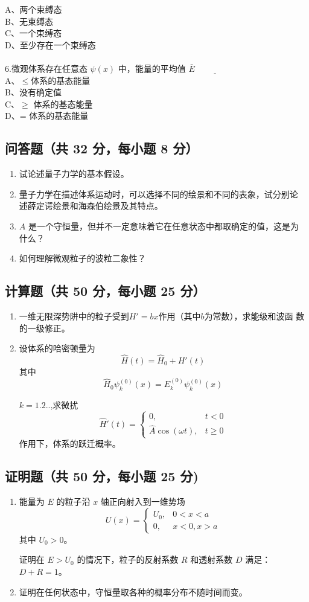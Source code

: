     A、两个束缚态\\
    B、无束缚态\\
    C、一个束缚态\\
    D、至少存在一个束缚态\\\\
6.微观体系存在任意态 $\psi(x)$ 中，能量的平均值 $\bar{E}\underline{\hspace{2cm}}$\\
    A、$\leq$体系的基态能量\\
    B、没有确定值\\
    C、$\geq$ 体系的基态能量 \\
    D、= 体系的基态能量\\
\subsection{问答题（共 32 分，每小题 8 分）}
\begin{enumerate}
\item 试论述量子力学的基本假设。
\item 量子力学在描述体系运动时，可以选择不同的绘景和不同的表象，试分别论
述薛定谔绘景和海森伯绘景及其特点。
\item $A$ 是一个守恒量，但并不一定意味着它在任意状态中都取确定的值，这是为
什么？
\item 如何理解微观粒子的波粒二象性？
\end{enumerate}
\subsection{计算题（共 50 分，每小题 25 分）}
\begin{enumerate}
\item 一维无限深势阱中的粒子受到$H' = bx$作用（其中$b$为常数），求能级和波函
数的一级修正。
\item 设体系的哈密顿量为 
\[
\hat{H}(t) = \hat{H}_0 + H'(t)~
\]
其中
\[
\hat{H}_0 \psi_k^{(0)}(x) = E_k^{(0)} \psi_k^{(0)}(x)~
\]

$k=1.2..$,求微扰
\[
\hat{H}'(t) = 
\begin{cases} 
0, & t < 0 \\
\hat{A} \cos(\omega t), & t \geq 0 
\end{cases}~
\]
作用下，体系的跃迁概率。

\end{enumerate}
\subsection{证明题（共 50 分，每小题 25 分)}
\begin{enumerate}
\item 能量为 $E$ 的粒子沿 $x$ 轴正向射入到一维势场 
\[
U(x) = 
\begin{cases} 
U_0, & 0 < x < a \\
0, & x < 0 , x > a 
\end{cases}~
\]
其中 $U_0 > 0$。

证明在 $E > U_0$ 的情况下，粒子的反射系数 $R$ 和透射系数 $D$ 满足：$D + R = 1$。
\item 证明在任何状态中，守恒量取各种的概率分布不随时间而变。
\end{enumerate}


